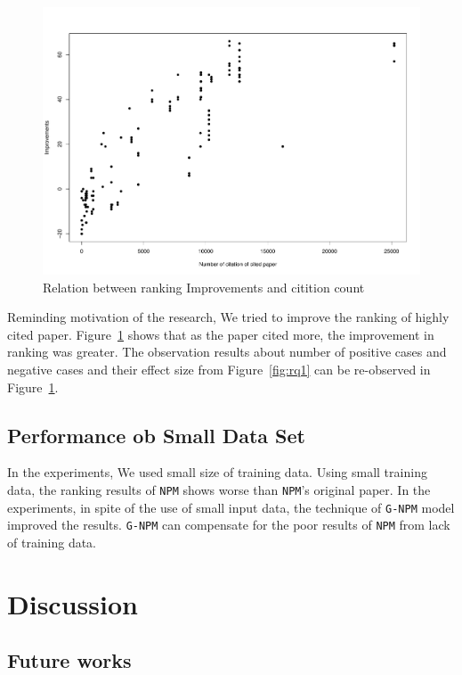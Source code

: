 \documentclass{llncs}
\newcommand{\name}{\texttt{G-NPM}\xspace}
\newcommand{\npm}{\texttt{NPM}\xspace}
\begin{document}
\begin{figure}[ht]
\centering
\includegraphics[width= \textwidth]{rq1_2.pdf}
\caption{Relation between ranking Improvements and citition count \label{fig:rq1_2}}
\end{figure}

Reminding motivation of the research, We tried to improve the ranking of highly cited paper. Figure~\ref{fig:rq1_2} shows that as the paper cited more, the improvement in ranking was greater.  The observation results about number of positive cases and negative cases and their effect size from Figure~\ref{fig:rq1}  can be re-observed in  Figure~\ref{fig:rq1_2}.


\subsection{Performance ob Small Data Set}

In the experiments, We used small size of training data. Using small training data, the ranking results of \npm shows worse than \npm's original paper\cite{Huang:2015:NPM:2886521.2886655}. In the experiments, in spite of the use of small input data, the technique of \name model improved the results. \name can compensate for the poor results  of \npm from lack of training data.


\section{Discussion}


\subsection{Future works}
\end{document}
